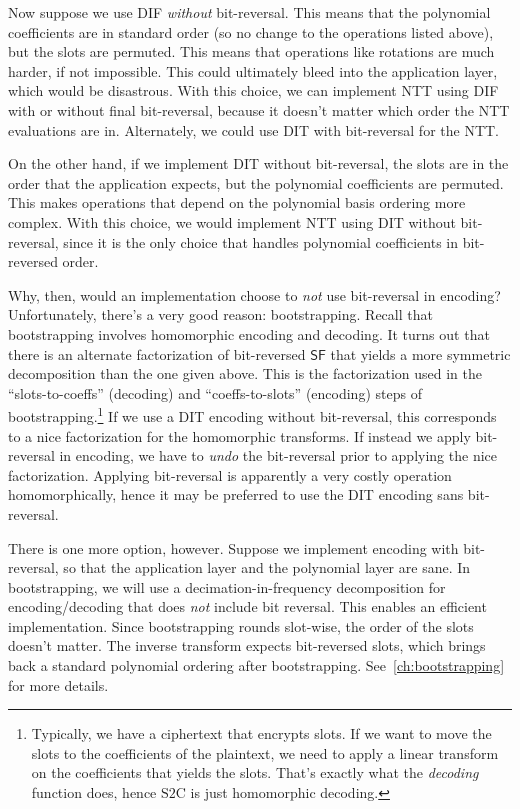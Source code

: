\documentclass[../fheimpl.tex]{subfiles}
\begin{document}
Now suppose we use DIF \emph{without} bit-reversal. This means that the polynomial coefficients are in standard order (so no change to the operations listed above), but the slots are permuted. This means that operations like rotations are much harder, if not impossible. This could ultimately bleed into the application layer, which would be disastrous. With this choice, we can implement NTT using DIF with or without final bit-reversal, because it doesn't matter which order the NTT evaluations are in. Alternately, we could use DIT with bit-reversal for the NTT.

On the other hand, if we implement DIT without bit-reversal, the slots are in the order that the application expects, but the polynomial coefficients are permuted. This makes operations that depend on the polynomial basis ordering more complex. With this choice, we would implement NTT using DIT without bit-reversal, since it is the only choice that handles polynomial coefficients in bit-reversed order.

Why, then, would an implementation choose to \emph{not} use bit-reversal in encoding? Unfortunately, there's a very good reason: bootstrapping. Recall that bootstrapping involves homomorphic encoding and decoding. It turns out that there is an alternate factorization of bit-reversed $\mathsf{SF}$ that yields a more symmetric decomposition than the one given above. This is the factorization used in the ``slots-to-coeffs'' (decoding) and ``coeffs-to-slots'' (encoding) steps of bootstrapping.\footnote{Typically, we have a ciphertext that encrypts slots. If we want to move the slots to the coefficients of the plaintext, we need to apply a linear transform on the coefficients that yields the slots. That's exactly what the \emph{decoding} function does, hence $\mathrm{S2C}$ is just homomorphic decoding.} If we use a DIT encoding without bit-reversal, this corresponds to a nice factorization for the homomorphic transforms. If instead we apply bit-reversal in encoding, we have to \emph{undo} the bit-reversal prior to applying the nice factorization. Applying bit-reversal is apparently a very costly operation homomorphically, hence it may be preferred to use the DIT encoding sans bit-reversal.

There is one more option, however. Suppose we implement encoding with bit-reversal, so that the application layer and the polynomial layer are sane. In bootstrapping, we will use a decimation-in-frequency decomposition for encoding/decoding that does \emph{not} include bit reversal. This enables an efficient implementation. Since bootstrapping rounds slot-wise, the order of the slots doesn't matter. The inverse transform expects bit-reversed slots, which brings back a standard polynomial ordering after bootstrapping. See~\cref{ch:bootstrapping} for more details.
\end{document}
